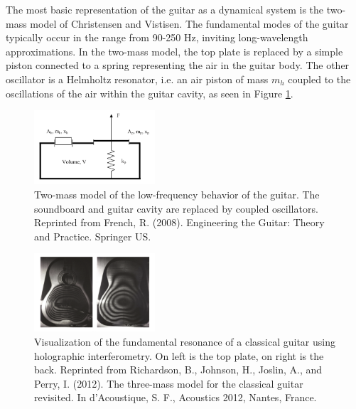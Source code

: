 \documentclass[
reprint,amsmath,amssymb,showpacs,citeautoscript,prb,twocolumn,notitlepage,floatfix
]{revtex4-1}
\begin{document}
The most basic representation of the guitar as a dynamical system is the two-mass model of Christensen and Vistisen.\cite{christensen1980:doi:10.1121/1.384814} The fundamental modes of the guitar typically occur in the range from 90-250 Hz, inviting long-wavelength approximations. In the two-mass model, the top plate is replaced by a simple piston connected to a spring representing the air in the guitar body. The other oscillator is a Helmholtz resonator, i.e. an air piston of mass $m_h$ coupled to the oscillations of the air within the guitar cavity, as seen in Figure \ref{fig:two-mass-model}.
\begin{figure}[ht]
    \begin{center}
        \includegraphics[width=0.4\textwidth]{images/french2008-two-mass-model.png}
        \caption{Two-mass model of the low-frequency behavior of the guitar. The soundboard and guitar cavity are replaced by coupled oscillators.  Reprinted from  French, R. (2008). Engineering the Guitar: Theory and Practice. Springer US.}
        \label{fig:two-mass-model}
    \end{center}
\end{figure}
\begin{figure}[ht]
    \begin{center}
        \includegraphics[width=0.4\textwidth]{images/richardson2012-fundamental-modes-holography.png}
        \caption{Visualization of the fundamental resonance of a classical guitar using holographic interferometry. On left is the top plate, on right is the back. Reprinted from Richardson, B., Johnson, H., Joslin, A., and Perry, I. (2012). The three-mass model for the classical guitar revisited. In d’Acoustique, S. F., Acoustics 2012, Nantes, France.}
        \label{fig:holography-fundamental-mode}
    \end{center}
\end{figure}
\end{document}
